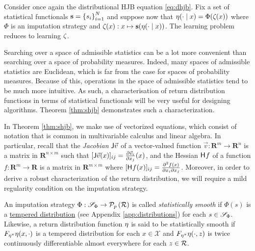 Consider once again the distributional HJB equation
\eqref{eq:dhjb}. Fix a set of statistical functionals $\mathbf{s} =
\indexedint{i}{N}{s}$ and suppose now that $\returnmeasure(\cdot\mid
x) = \Phi(\statistics(x))$ where $\Phi$ is an imputation
strategy and
${\statistics(x):x\mapsto\mathbf{s}(\returnmeasure(\cdot\mid x))}$.
The learning problem reduces to learning $\statistics$.

Searching over a space of admissible statistics can be a lot more convenient
than searching over a space of probability measures. Indeed, many spaces of
admissible statistics are Euclidean, which is far from the case for spaces of
probability measures. Because of this, operations in the space of admissible
statistics tend to be much more intuitive. As such, a characterisation of return
distribution functions in terms of statistical functionals will be very useful
for designing algorithms. Theorem \ref{thm:shjb} demonstrates such a
characterization.

In Theorem \ref{thm:shjb}, we make use of vectorized equations, which consist of
notation that is common in multivariable calculus and linear algebra. In
particular, recall that the \emph{Jacobian} $\jacobian\vec{v}$ of a
vector-valued function $\vec{v}:\mathbf{R}^m\to\mathbf{R}^n$ is a matrix in
$\mathbf{R}^{n\times m}$ such that $[\jacobian\vec{v}(x)]_{ij}
=\partialderiv{\vec{v}_i}{x_j}(x)$, and the Hessian $\hessian{}f$ of a function
$f:\mathbf{R}^m\to\mathbf{R}$ is a matrix in $\mathbf{R}^{m\times m}$ where
$[\hessian{}f(x)]_{ij} = \frac{\partial^2f(x)}{\partial x_i\partial x_j}$.
Moreover, in order to derive a robust characterization of the return
distribution, we will require a mild regularity condition on the imputation
strategy.

\begin{definition}\label{def:statistical-smoothness}
  An imputation strategy $\Phi:\statsdomain{\Phi}\to\probset[p]{\returnspace}$ is called
  \emph{statistically smooth} if
  $\Phi(s)$ is a
  \hyperref[def:tempered-distribution]{tempered distribution} (see Appendix
  \ref{app:distributions}) for each $s\in\statsdomain{\Phi}$. Likewise,
  a return distribution function $\returnmeasure$ is said to be
  statistically smooth if $\cdf{\returnmeasure}(x, \cdot)$ is a tempered
  distribution for each $x\in\mathcal{X}$ and $\cdf{\returnmeasure}(\cdot, z)$
  is twice continuously differentiable almost everywhere for each
  $z\in\returnspace$.
\end{definition}

